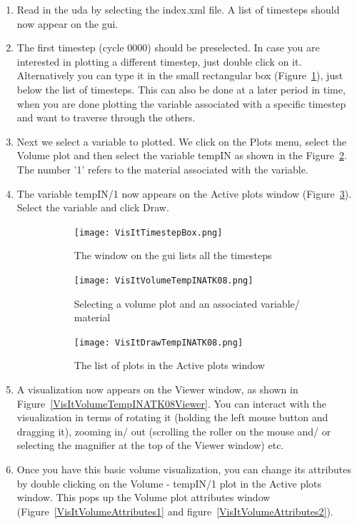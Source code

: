 \begin{enumerate}

\item Read in the uda by selecting the index.xml file. A list of
  timesteps should now appear on the gui.


\item The first timestep (cycle 0000) should be preselected. In case you
are interested in plotting a different timestep, just double click on
it. Alternatively you can type it in the small rectangular box
(Figure~\ref{VisItTimestepBox}), just below the list of
timesteps. This can also be done at a later period in time, when you
are done plotting the variable associated with a specific timestep and
want to traverse through the others.


\item Next we select a variable to plotted. We click on the Plots
  menu, select the Volume plot and then select the variable tempIN as
  shown in the Figure~\ref{VisItVolumeTempINATK08}. The number '1'
  refers to the material associated with the variable.

\item The variable tempIN/1 now appears on the Active plots window
  (Figure~\ref{VisItDrawTempINATK08}). Select the variable and click
  Draw.

\begin{figure}[htb]
  \centering
  \begin{subfigure}[b]{0.3\textwidth}
    \texttt{[image: VisItTimestepBox.png]}
    \caption{The window on the gui lists all the timesteps}
    \label{VisItTimestepBox}
  \end{subfigure}
  \begin{subfigure}[b]{0.3\textwidth}
    \texttt{[image: VisItVolumeTempINATK08.png]}
    \caption{Selecting a volume plot and an associated variable/ material}
    \label{VisItVolumeTempINATK08}
  \end{subfigure}
  \begin{subfigure}[b]{0.3\textwidth}
    \texttt{[image: VisItDrawTempINATK08.png]}
    \caption{The list of plots in the Active plots window}
    \label{VisItDrawTempINATK08}
  \end{subfigure}
  \caption{}
  \label{ucf:fig4}
\end{figure}


\item A visualization now appears on the Viewer window, as shown in
  Figure~\ref{VisItVolumeTempINATK08Viewer}. You can interact with the
  visualization in terms of rotating it (holding the left mouse button
  and dragging it), zooming in/ out (scrolling the roller on the mouse
  and/ or selecting the magnifier at the top of the Viewer window)
  etc.


\item Once you have this basic volume visualization, you can change
  its attributes by double clicking on the Volume - tempIN/1 plot in
  the Active plots window. This pops up the Volume plot attributes
  window (Figure~\ref{VisItVolumeAttributes1} and
  figure~\ref{VisItVolumeAttributes2}).

\end{enumerate}


